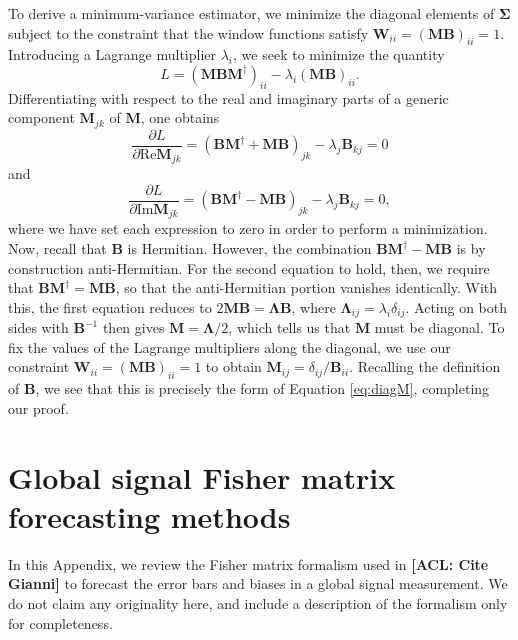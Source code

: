 \documentclass[twolcolumn,apj,iop,numberedappendix]{emulateapj}
\newcommand{\M}{\mathbf{M}}
\newcommand{\W}{\mathbf{W}}
\newcommand{\acl}[1]{{\color{red} \textbf{[ACL:  #1]}}}
\begin{document}
To derive a minimum-variance estimator, we minimize the diagonal elements of $\boldsymbol \Sigma$ subject to the constraint that the window functions satisfy $\W_{ii} = (\M \mathbf{B})_{ii} =1$. Introducing a Lagrange multiplier $\lambda_i$, we seek to minimize the quantity
\begin{equation}
L = (\M \mathbf{B} \M^\dagger)_{ii} - \lambda_i  (\M \mathbf{B})_{ii}.
\end{equation}
Differentiating with respect to the real and imaginary parts of a generic component $\M_{jk}$ of $\M$, one obtains
\begin{equation}
\frac{\partial L}{\partial \textrm{Re} \M_{jk}} = (\mathbf{B} \M^\dagger + \M \mathbf{B})_{jk} - \lambda_j \mathbf{B}_{kj} =0
\end{equation}
and
\begin{equation}
\frac{\partial L}{\partial \textrm{Im} \M_{jk}} = (\mathbf{B} \M^\dagger - \M \mathbf{B})_{jk} - \lambda_j \mathbf{B}_{kj} =0,
\end{equation}
where we have set each expression to zero in order to perform a minimization. Now, recall that $\mathbf{B}$ is Hermitian. However, the combination $\mathbf{B} \M^\dagger - \M \mathbf{B}$ is by construction anti-Hermitian. For the second equation to hold, then, we require that $\mathbf{B} \M^\dagger = \M \mathbf{B}$, so that the anti-Hermitian portion vanishes identically. With this, the first equation reduces to $2 \M \mathbf{B} = \boldsymbol \Lambda \mathbf{B}$, where $\boldsymbol \Lambda_{ij} = \lambda_i \delta_{ij}$. Acting on both sides with $\mathbf{B}^{-1}$ then gives $\M = \boldsymbol \Lambda / 2$, which tells us that $\M$ must be diagonal. To fix the values of the Lagrange multipliers along the diagonal, we use our constraint $\W_{ii} = (\M \mathbf{B})_{ii} =1$ to obtain $\M_{ij} = \delta_{ij} / \mathbf{B}_{ii}$. Recalling the definition of $\mathbf{B}$, we see that this is precisely the form of Equation \eqref{eq:diagM}, completing our proof.

\section{Global signal Fisher matrix forecasting methods}
\label{fisher}
In this Appendix, we review the Fisher matrix formalism used in \acl{Cite Gianni} to forecast the error bars and biases in a global signal measurement. We do not claim any originality here, and include a description of the formalism only for completeness.
\end{document}
